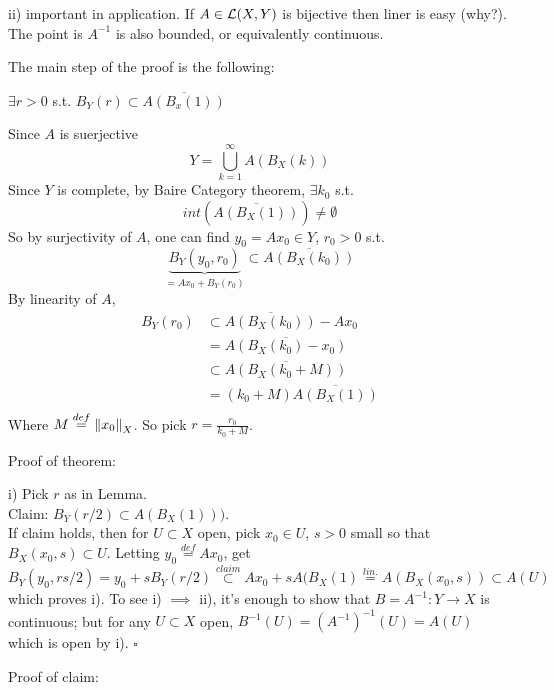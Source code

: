\begin{remark}\nl
ii) important in application. If $A\in\mathcal{L}({X},{Y})$ is bijective then  liner is easy (why?). The point is $A^{-1}$ is also bounded, or equivalently continuous.
\end{remark}

The main step of the proof is the following:
\begin{lemma}[$A$ as in i)]\nl
$\exists r>0$ s.t. $B_Y(r)\subset \overline{A(B_x(1))}$
\begin{pf}{}{}\rm
Since $A$ is suerjective 
$$
Y=\bigcup_{k=1}^\infty A(B_X(k))
$$
Since $Y$ is complete, by  Baire Category theorem, $\exists k_0$ s.t. 
$$ int(\overline{A(B_X(1))})\neq\emptyset$$
So by surjectivity of $A$, one can find $y_0=Ax_0\in Y$, $r_0>0$ s.t. 
$$ \underbrace{B_Y(y_0,r_0)}_{=Ax_0+B_Y(r_0)}\subset \overline{A(B_X(k_0))}$$
By linearity of $A$,
\begin{equation}\nonumber
    \begin{split}
        B_Y(r_0)&\subset\overline{A(B_X(k_0))}-Ax_0 \\ &=\overline{A(B_X(k_0)-x_0)}\\
        &\subset \overline{A(B_X(k_0+M))}   \\
        &=(k_0+M)\overline{A(B_X(1))}\\
    \end{split}
\end{equation}
Where $M\stackrel{def}{=}\left\|{x_0}\right\|_X$. So pick $r=\frac{r_0}{k_0+M}$.
\end{pf}

\end{lemma}
Proof of theorem:
\begin{pf}{}{}
i) Pick $r$ as in Lemma.\\
Claim: $B_Y(r/2)\subset A(B_X(1)))$.\\
If claim holds, then for $U\subset X$ open, pick $x_0\in U$, $s>0$ small so that $B_X(x_0,s)\subset U$. Letting $y_0\stackrel{def}{=}Ax_0$, get 
$$
B_Y(y_0,rs/2)=y_0+sB_Y(r/2)\stackrel{claim}{\subset}Ax_0+sA(B_X(1)\stackrel{lin.}{=}A(B_X(x_0,s))\subset A(U)
$$
which proves i). To see i) $\implies$ ii), it's enough to show that $B=A^{-1}:Y\to X$ is continuous; but for any $U\subset X$ open, $B^{-1}(U)=(A^{-1})^{-1}(U)=A(U)$
which is open by i). $\square$
\end{pf}
Proof of claim:
